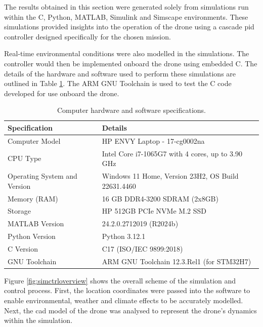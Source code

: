 The results obtained in this section were generated solely from simulations run within the C, Python, MATLAB, Simulink and Simscape environments. These simulations provided insights into the operation of the drone using a cascade \gls{pid} controller designed specifically for the chosen mission.  

Real-time environmental conditions were also modelled in the simulations. The controller would then be implemented onboard the drone using embedded C. The details of the hardware and software used to perform these simulations are outlined in Table \ref{tab:computersetup}. The ARM GNU Toolchain is used to test the C code developed for use onboard the drone.  
\begin{table}[h]
\vspace{10mm}
\begin{center}
\begin{tabular}{| p{6cm}|p{10cm}|}
 \hline
 \textbf{Specification}       & Details\\ 
 \hline
 Computer Model                & HP ENVY Laptop - 17-cg0002na          \\ 
 CPU Type                     & Intel Core i7-1065G7 with 4 cores, up to 3.90 GHz \\ 
 Operating System and Version & Windows 11 Home, Version 23H2, OS Build 22631.4460 \\ 
 Memory (RAM)                 & 16 GB DDR4-3200 SDRAM (2x8GB)      \\  
 Storage                      & HP 512GB PCIe NVMe M.2 SSD            \\ 
 MATLAB Version               & 24.2.0.2712019 (R2024b) \\ 
  Python Version& Python 3.12.1\\
 C Version&C17 (ISO/IEC 9899:2018)\\ 
 GNU Toolchain& ARM GNU Toolchain 12.3.Rel1 (for STM32H7)\\ 
 \hline
\end{tabular}
\end{center}
\caption{Computer hardware and software specifications.}
\label{tab:computersetup}
\end{table}

Figure \ref{fig:simctrloverview} shows the overall scheme of the simulation and control process. First, the location coordinates were passed into the software to enable environmental, weather and climate effects to be accurately modelled. Next, the \gls{cad} model of the drone was analysed to represent the drone's dynamics within the simulation.

